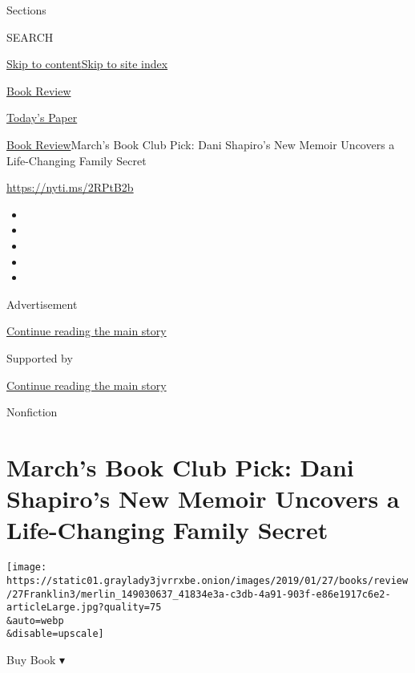 Sections

SEARCH

\protect\hyperlink{site-content}{Skip to
content}\protect\hyperlink{site-index}{Skip to site index}

\href{https://www.nytimes3xbfgragh.onion/section/books/review}{Book
Review}

\href{https://myaccount.nytimes3xbfgragh.onion/auth/login?response_type=cookie\&client_id=vi}{}

\href{https://www.nytimes3xbfgragh.onion/section/todayspaper}{Today's
Paper}

\href{/section/books/review}{Book Review}\textbar{}March's Book Club
Pick: Dani Shapiro's New Memoir Uncovers a Life-Changing Family Secret

\url{https://nyti.ms/2RPtB2b}

\begin{itemize}
\item
\item
\item
\item
\item
\end{itemize}

Advertisement

\protect\hyperlink{after-top}{Continue reading the main story}

Supported by

\protect\hyperlink{after-sponsor}{Continue reading the main story}

Nonfiction

\hypertarget{marchs-book-club-pick-dani-shapiros-new-memoir-uncovers-a-life-changing-family-secret}{%
\section{March's Book Club Pick: Dani Shapiro's New Memoir Uncovers a
Life-Changing Family
Secret}\label{marchs-book-club-pick-dani-shapiros-new-memoir-uncovers-a-life-changing-family-secret}}

\texttt{[image: https://static01.graylady3jvrrxbe.onion/images/2019/01/27/books/review/27Franklin3/merlin\_149030637\_41834e3a-c3db-4a91-903f-e86e1917c6e2-articleLarge.jpg?quality=75\\\&auto=webp\\\&disable=upscale]}

Buy Book ▾

